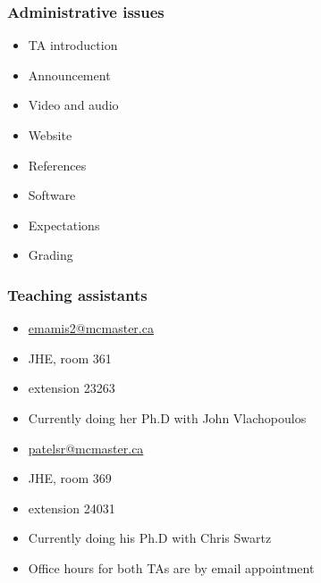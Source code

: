 \begin{frame}\frametitle{Administrative issues}
	\begin{itemize}
		\item	TA introduction 
		\item	Announcement 
		\item	Video and audio 
		\item	Website 
		\item	References 
		\item	Software 
		\item	Expectations 
		\item	Grading 
	\end{itemize}
\end{frame}

\begin{frame}\frametitle{Teaching assistants}
	\vspace{12pt}
	{\color{myGreen}{Maryam Emami}}
	\begin{itemize}
		\item	\url{emamis2@mcmaster.ca}
		\item	JHE, room 361
		\item	extension  23263
		\item	Currently doing her Ph.D with John Vlachopoulos
	\end{itemize}
	{\color{myGreen}{Shailesh Patel}}
	\begin{itemize}
		\item	\url{patelsr@mcmaster.ca}
		\item	JHE, room 369
		\item	extension 24031
		\item	Currently doing his Ph.D with Chris Swartz
	\end{itemize}
	\begin{itemize}
		\item	Office hours for both TAs are by email appointment
	\end{itemize}
\end{frame}

